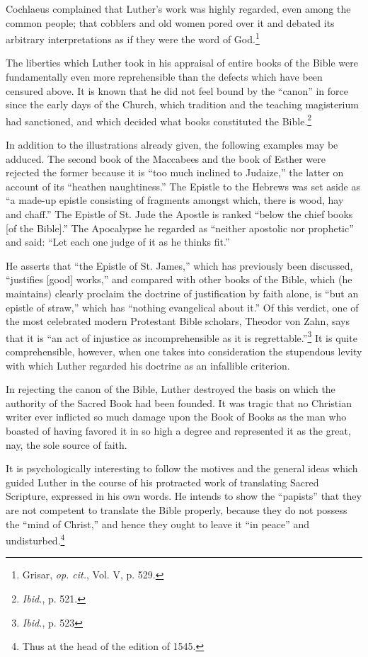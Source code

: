 Cochlaeus complained that Luther’s work was highly regarded,
even among the common people; that cobblers and old women pored
over it and debated its arbitrary interpretations as if they were the
word of God.\footnote{Grisar, \textit{op. cit.}, Vol. V, p. 529.}


The liberties which Luther took in his appraisal of entire books of
the Bible were fundamentally even more reprehensible than the defects
which have been censured above. It is known that he did not feel
bound by the “canon” in force since the early days of the Church,
which tradition and the teaching magisterium had sanctioned, and
which decided what books constituted the Bible.\footnote{\textit{Ibid.}, p. 521.}


In addition to the illustrations already given, the following examples may
be adduced. The second book of the Maccabees and the book of Esther were
rejected the former because it is “too much inclined to Judaize,” the latter
on account of its “heathen naughtiness.” The Epistle to the Hebrews was
set aside as “a made-up epistle consisting of fragments amongst which,
there is wood, hay and chaff.” The Epistle of St. Jude the Apostle is
ranked “below the chief books [of the Bible].” The Apocalypse he regarded
as “neither apostolic nor prophetic” and said: “Let each one judge of it as he
thinks fit.”

He asserts that “the Epistle of St. James,” which has previously been discussed,
“justifies [good] works,” and compared with other books of the
Bible, which (he maintains) clearly proclaim the doctrine of justification
by faith alone, is “but an epistle of straw,” which has “nothing
evangelical about it.” Of this verdict, one of the most celebrated modern
Protestant Bible scholars, Theodor von Zahn, says that it is “an act of injustice
as incomprehensible as it is regrettable.”\footnote{\textit{Ibid.}, p. 523}
 It is quite comprehensible,
however, when one takes into consideration the stupendous levity with which
Luther regarded his doctrine as an infallible criterion.

In rejecting the canon of the Bible, Luther destroyed the basis on
which the authority of the Sacred Book had been founded. It was
tragic that no Christian writer ever inflicted so much damage upon
the Book of Books as the man who boasted of having favored it in so
high a degree and represented it as the great, nay, the sole source of
faith.

It is psychologically interesting to follow the motives and the
general ideas which guided Luther in the course of his protracted
work of translating Sacred Scripture, expressed in his own words.
He intends to show the “papists” that they are not competent to
translate the Bible properly, because they do not possess the “mind of
Christ,” and hence they ought to leave it “in peace” and undisturbed.\footnote{Thus at the head of the edition of 1545.}


